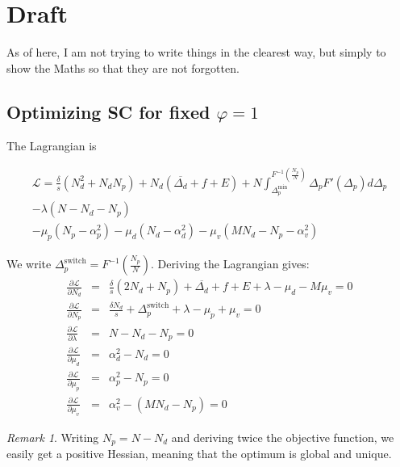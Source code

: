 \documentclass[english, a4paper]{article}
\theoremstyle{plain}
\theoremstyle{definition}
\theoremstyle{remark}
\newtheorem{remark}{Remark}
\begin{document}
\section{Draft}

As of here, I am not trying to write things in the clearest way, but simply to show the Maths so that they are not forgotten.

\subsection{Optimizing SC for fixed $\varphi = 1$}

The Lagrangian is

\begin{multline}
    \mathcal{L} = \frac{\delta}{s} (N_d^2 + N_d N_p) + N_d(\overline{\Delta_d} + f + E) + N\int_{\Delta_p^{\text{min}}}^{F^{-1}\left( \frac{N_p}{N} \right)} \Delta_p F'(\Delta_p)d\Delta_p\\
    - \lambda (N-N_d-N_p)\\
    -\mu_p(N_p - \alpha_p^2) - \mu_d(N_d - \alpha _d^2) - \mu_v(MN_d - N_p - \alpha _v^2)
\end{multline}

We write $\Delta_p^{\text{switch}} = F^{-1}\left( \frac{N_p}{N} \right)$. Deriving the Lagrangian gives:
\begin{eqnarray}
\label{eqnarray_varphi1_partialNd}
\frac{\partial \mathcal{L}}{\partial N_d} &=& \frac{\delta}{s} (2N_d + N_p) + \overline{\Delta_d} + f + E + \lambda - \mu_d - M\mu_v = 0\\
\label{eqnarray_varphi1_partialNp}
\frac{\partial \mathcal{L}}{\partial N_p} &=& \frac{\delta N_d}{s} + \Delta_p^{\text{switch}} + \lambda - \mu_p + \mu_v = 0\\
\frac{\partial \mathcal{L}}{\partial \lambda} &=& N - N_d - N_p = 0\\
\frac{\partial \mathcal{L}}{\partial \mu_d} &=& \alpha_d^2 - N_d = 0\\
\frac{\partial \mathcal{L}}{\partial \mu_p} &=& \alpha_p^2 - N_p = 0\\
\frac{\partial \mathcal{L}}{\partial \mu_v} &=& \alpha_v^2 - (MN_d - N_p) = 0
\end{eqnarray}

\begin{remark}
    Writing $N_p = N - N_d$ and deriving twice the objective function, we easily get a positive Hessian, meaning that the optimum is global and unique.
\end{remark}
\end{document}

